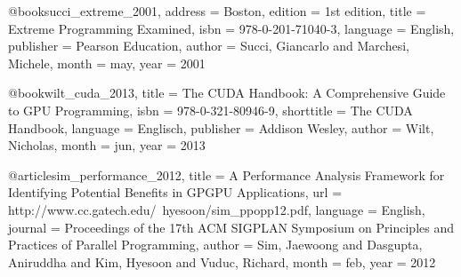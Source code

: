 {@book{succi_extreme_2001,
	address = {Boston},
	edition = {1st edition},
	title = {Extreme {Programming} {Examined}},
	isbn = {978-0-201-71040-3},
	language = {English},
	publisher = {Pearson Education},
	author = {Succi, Giancarlo and Marchesi, Michele},
	month = may,
	year = {2001}
}

@book{wilt_cuda_2013,
	title = {The {CUDA} {Handbook}: {A} {Comprehensive} {Guide} to {GPU} {Programming}},
	isbn = {978-0-321-80946-9},
	shorttitle = {The {CUDA} {Handbook}},
	language = {Englisch},
	publisher = {Addison Wesley},
	author = {Wilt, Nicholas},
	month = jun,
	year = {2013}
}

@article{sim_performance_2012,
	title = {A {Performance} {Analysis} {Framework} for {Identifying} {Potential} {Benefits} in {GPGPU} {Applications}},
	url = {http://www.cc.gatech.edu/~hyesoon/sim_ppopp12.pdf},
	language = {English},
	journal = {Proceedings of the 17th ACM SIGPLAN Symposium on Principles and Practices of Parallel Programming},
	author = {Sim, Jaewoong and Dasgupta, Aniruddha and Kim, Hyesoon and Vuduc, Richard},
	month = feb,
	year = {2012}
}

}

